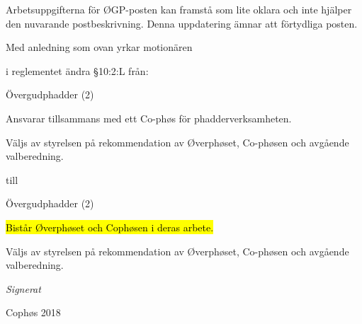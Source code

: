 \documentclass[../_main/handlingar.tex]{subfiles}
\begin{document}
Arbetsuppgifterna för ØGP-posten kan framstå som lite oklara och inte hjälper den nuvarande
postbeskrivning. Denna uppdatering ämnar att förtydliga posten.

Med anledning som ovan yrkar motionären

\begin{attsatser}
  \att i reglementet ändra \S10:2:L från:\par
  \begin{emptylist}
    \item Övergudphadder (2)
      \begin{dashlist}
        \item Ansvarar tillsammans med ett Co-phøs för phadderverksamheten.
        \item Väljs av styrelsen på rekommendation av Øverphøset, Co-phøsen och avgående
        valberedning.
      \end{dashlist}
    \end{emptylist}
    
    till 
    
    \begin{emptylist}
        \item Övergudphadder (2)
        \begin{dashlist}
          \item \hl{Bistår Øverphøset och Cophøsen i deras arbete.}
          \item Väljs av styrelsen på rekommendation av Øverphøset, Co-phøsen och avgående
          valberedning.
        \end{dashlist}
    \end{emptylist}
  \changenote
\end{attsatser}




\begin{signatures}{1}
    \textit{Signerat}
    \signature{Edvard Carlsson}{Cophøs 2018}

\end{signatures}
\end{document}
